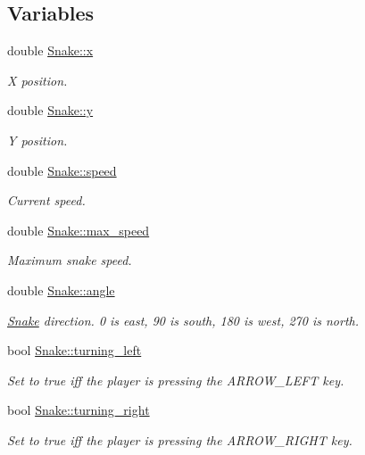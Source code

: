 \subsection*{Variables}
\begin{DoxyCompactItemize}
\item 
double \mbox{\hyperlink{group__snake_ga785740f93d9f05bf6821595b78000b64}{Snake\+::x}}
\begin{DoxyCompactList}\small\item\em X position. \end{DoxyCompactList}\item 
double \mbox{\hyperlink{group__snake_gac2c669473500f0d409a6e809700f537d}{Snake\+::y}}
\begin{DoxyCompactList}\small\item\em Y position. \end{DoxyCompactList}\item 
double \mbox{\hyperlink{group__snake_ga203349d9342db170b9745c3da26dbcbe}{Snake\+::speed}}
\begin{DoxyCompactList}\small\item\em Current speed. \end{DoxyCompactList}\item 
double \mbox{\hyperlink{group__snake_ga52857dbba7b74ca5c06b9b872cc1fb67}{Snake\+::max\+\_\+speed}}
\begin{DoxyCompactList}\small\item\em Maximum snake speed. \end{DoxyCompactList}\item 
double \mbox{\hyperlink{group__snake_ga74c9d3c783fec83cb7efbdd228821fe7}{Snake\+::angle}}
\begin{DoxyCompactList}\small\item\em \mbox{\hyperlink{struct_snake}{Snake}} direction. 0 is east, 90 is south, 180 is west, 270 is north. \end{DoxyCompactList}\item 
bool \mbox{\hyperlink{group__snake_ga2c1982167b9cfb8ead89775dbef75be3}{Snake\+::turning\+\_\+left}}
\begin{DoxyCompactList}\small\item\em Set to true iff the player is pressing the A\+R\+R\+O\+W\+\_\+\+L\+E\+FT key. \end{DoxyCompactList}\item 
bool \mbox{\hyperlink{group__snake_ga3c8626bc3f65ba80fb852c3cfeaf356c}{Snake\+::turning\+\_\+right}}
\begin{DoxyCompactList}\small\item\em Set to true iff the player is pressing the A\+R\+R\+O\+W\+\_\+\+R\+I\+G\+HT key. \end{DoxyCompactList}\item 

\end{DoxyCompactItemize}
